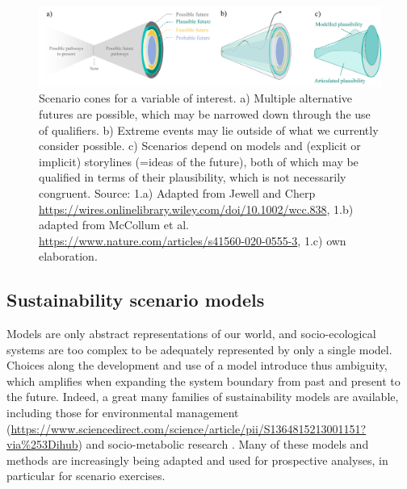 \documentclass{article}
\begin{document}
\begin{refsection}
\begin{figure} [ht]
    \includegraphics[width=\textwidth]{Cones_plausibility.png} 
    \caption[Some caption for list of figures]{Scenario cones for a variable of interest. a) Multiple alternative futures are possible, which may be narrowed down through the use of qualifiers. b) Extreme events may lie outside of what we currently consider possible. c) Scenarios depend on models and (explicit or implicit) storylines (=ideas of the future), both of which may be qualified in terms of their plausibility, which is not necessarily congruent. 
    Source: 1.a) Adapted from Jewell and Cherp \url{https://wires.onlinelibrary.wiley.com/doi/10.1002/wcc.838}, 1.b) adapted from McCollum et al. \url{https://www.nature.com/articles/s41560-020-0555-3}, 1.c) own elaboration.}  
    \label{fig:plausibility}
\end{figure}

\subsection{Sustainability scenario models}

Models are only abstract representations of our world, and socio-ecological systems are too complex to be adequately represented by only a single model. 
Choices along the development and use of a model introduce thus ambiguity, which amplifies when expanding the system boundary from past and present to the future. 
Indeed, a great many families of sustainability models are available, including those for environmental management (\url{https://www.sciencedirect.com/science/article/pii/S1364815213001151?via%253Dihub}) and socio-metabolic research \parencite{haberl_2019}. 
Many of these models and methods are increasingly being adapted and used for prospective analyses, in particular for scenario exercises.


\end{refsection}
\end{document}
